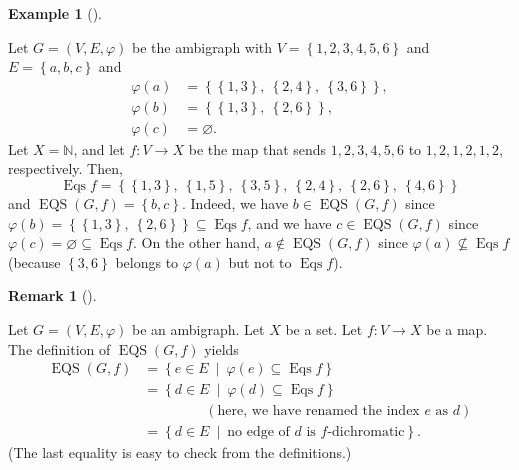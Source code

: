 \documentclass[numbers=enddot,12pt,final,onecolumn,notitlepage]{scrartcl}%
\theoremstyle{definition}
\newtheorem{remk}[theo]{Remark}
\newenvironment{remark}[1][]
{\begin{remk}[#1]\begin{leftbar}}
{\end{leftbar}\end{remk}}
\newtheorem{exmp}[theo]{Example}
\newenvironment{example}[1][]
{\begin{exmp}[#1]\begin{leftbar}}
{\end{leftbar}\end{exmp}}
\begin{document}
\begin{example}
Let $G=\left(  V,E,\varphi\right)  $ be the ambigraph with $V=\left\{
1,2,3,4,5,6\right\}  $ and $E=\left\{  a,b,c\right\}  $ and%
\begin{align*}
\varphi\left(  a\right)   &  =\left\{  \left\{  1,3\right\}  ,\ \left\{
2,4\right\}  ,\ \left\{  3,6\right\}  \right\}  ,\\
\varphi\left(  b\right)   &  =\left\{  \left\{  1,3\right\}  ,\ \left\{
2,6\right\}  \right\}  ,\\
\varphi\left(  c\right)   &  =\varnothing.
\end{align*}
Let $X=\mathbb{N}$, and let $f:V\rightarrow X$ be the map that sends
$1,2,3,4,5,6$ to $1,2,1,2,1,2$, respectively. Then,
\[
\operatorname*{Eqs}f=\left\{  \left\{  1,3\right\}  ,\ \left\{  1,5\right\}
,\ \left\{  3,5\right\}  ,\ \left\{  2,4\right\}  ,\ \left\{  2,6\right\}
,\ \left\{  4,6\right\}  \right\}
\]
and $\operatorname*{EQS}\left(  G,f\right)  =\left\{  b,c\right\}  $. Indeed,
we have $b\in\operatorname*{EQS}\left(  G,f\right)  $ since $\varphi\left(
b\right)  =\left\{  \left\{  1,3\right\}  ,\ \left\{  2,6\right\}  \right\}
\subseteq\operatorname*{Eqs}f$, and we have $c\in\operatorname*{EQS}\left(
G,f\right)  $ since $\varphi\left(  c\right)  =\varnothing\subseteq
\operatorname*{Eqs}f$. On the other hand, $a\notin\operatorname*{EQS}\left(
G,f\right)  $ since $\varphi\left(  a\right)  \not \subseteq
\operatorname*{Eqs}f$ (because $\left\{  3,6\right\}  $ belongs to
$\varphi\left(  a\right)  $ but not to $\operatorname*{Eqs}f$).
\end{example}

\begin{remark}
\label{rmk.ambiEQS.rewrite}Let $G=\left(  V,E,\varphi\right)  $ be an
ambigraph. Let $X$ be a set. Let $f:V\rightarrow X$ be a map. The definition
of $\operatorname*{EQS}\left(  G,f\right)  $ yields%
\begin{align}
\operatorname*{EQS}\left(  G,f\right)   &  =\left\{  e\in E\ \mid
\ \varphi\left(  e\right)  \subseteq\operatorname*{Eqs}f\right\}
\label{eq.rmk.ambiEQS.rewrite.1}\\
&  =\left\{  d\in E\ \mid\ \varphi\left(  d\right)  \subseteq
\operatorname*{Eqs}f\right\} \label{eq.rmk.ambiEQS.rewrite.2}\\
&  \ \ \ \ \ \ \ \ \ \ \ \ \ \ \ \ \ \ \ \ \left(  \text{here, we have renamed
the index }e\text{ as }d\right) \nonumber\\
&  =\left\{  d\in E\ \mid\ \text{no edge of }d\text{ is }f\text{-dichromatic}%
\right\}  . \label{eq.rmk.ambiEQS.rewrite.3}%
\end{align}
(The last equality is easy to check from the definitions.)
\end{remark}
\end{document}
